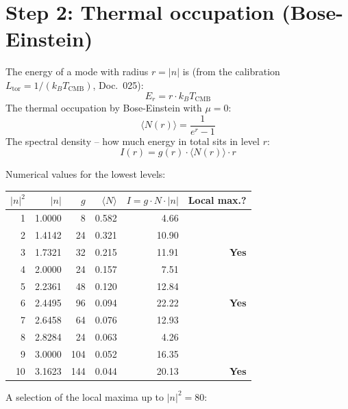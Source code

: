 \section{Step 2: Thermal occupation (Bose-Einstein)}

The energy of a mode with radius $r = |n|$ is (from the calibration
$L_\mathrm{tor} = 1/(k_B T_\mathrm{CMB})$, Doc.~025):
\[
  E_r = r \cdot k_B T_\mathrm{CMB}
\]
The thermal occupation by Bose-Einstein with $\mu = 0$:
\[
  \langle N(r) \rangle = \frac{1}{e^r - 1}
\]
The spectral density -- how much energy in total sits in level $r$:
\[
  \boxed{I(r) = g(r) \cdot \langle N(r) \rangle \cdot r}
\]

Numerical values for the lowest levels:

\begin{center}
\begin{tabular}{rrrrrr}
\toprule
$|n|^2$ & $|n|$ & $g$ & $\langle N\rangle$ & $I = g\cdot N\cdot |n|$ & Local max.? \\
\midrule
1  & 1{.}0000 & 8   & 0{.}582 & 4{.}66  & \\
2  & 1{.}4142 & 24  & 0{.}321 & 10{.}90 & \\
3  & 1{.}7321 & 32  & 0{.}215 & 11{.}91 & \textbf{Yes} \\
4  & 2{.}0000 & 24  & 0{.}157 & 7{.}51  & \\
5  & 2{.}2361 & 48  & 0{.}120 & 12{.}84 & \\
6  & 2{.}4495 & 96  & 0{.}094 & 22{.}22 & \textbf{Yes} \\
7  & 2{.}6458 & 64  & 0{.}076 & 12{.}93 & \\
8  & 2{.}8284 & 24  & 0{.}063 & 4{.}26  & \\
9  & 3{.}0000 & 104 & 0{.}052 & 16{.}35 & \\
10 & 3{.}1623 & 144 & 0{.}044 & 20{.}13 & \textbf{Yes} \\
\bottomrule
\end{tabular}
\end{center}

A selection of the local maxima up to $|n|^2 = 80$:

